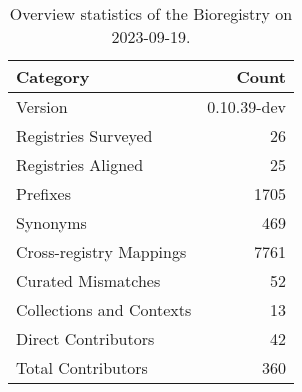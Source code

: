 \begin{table}
\caption{Overview statistics of the Bioregistry on 2023-09-19.}
\label{tab:bioregistry-summary}
\begin{tabular}{lr}
\toprule
Category & Count \\
\midrule
Version & 0.10.39-dev \\
Registries Surveyed & 26 \\
Registries Aligned & 25 \\
Prefixes & 1705 \\
Synonyms & 469 \\
Cross-registry Mappings & 7761 \\
Curated Mismatches & 52 \\
Collections and Contexts & 13 \\
Direct Contributors & 42 \\
Total Contributors & 360 \\
\bottomrule
\end{tabular}
\end{table}
